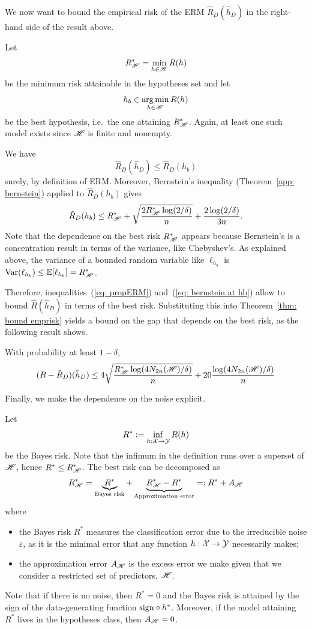 \documentclass[reqno]{amsart}
\begin{document}
We now want to bound the empirical risk of the ERM $\hat R_D(\hat h_D)$ in the right-hand side of the result above. 

Let
\[
R^*_{\mathscr{H}} = \min_{h\in\mathscr{H}} R(h)
\]
be the minimum risk attainable in the hypotheses set
and let \[
h_b \in \operatorname*{arg\,min}_{h\in\mathscr{H}} R(h)
\]
be the best hypothesis, i.e.\ the one attaining $R^*_{\mathscr{H}}$. Again, at least one such model exists since $\mathscr{H}$ is finite and nonempty. 

We have
\begin{equation}\label{eq: propERM}
\hat R_D(\hat h_D) \le \hat R_D (h_b)
\end{equation}
surely, by definition of ERM. Moreover, Bernstein's inequality (Theorem~\ref{app: bernstein}) applied to $\hat R_D(h_b)$ gives
\begin{equation}\label{eq: bernstein at hb}
\hat R_D(h_b) \le R^*_{\mathscr{H}} + \sqrt{\frac{2R^*_{\mathscr{H}} \log (2/\delta)}{n}} + \frac{2\log(2/\delta)}{3n}.
\end{equation}
Note that the dependence on the best risk $R^*_{\mathscr{H}}$ appears because Bernstein's is a concentration result in terms of the variance, like Chebyshev's. As explained above, the variance of a bounded random variable like $\ell_{h_b}$ is $\operatorname{Var}(\ell_{h_b}) \le \mathbb{E}[\ell_{h_b}] = R^*_{\mathscr{H}}$.

Therefore, inequalities~(\ref{eq: propERM}) and~(\ref{eq: bernstein at hb}) allow to bound $\hat R(\hat h_D)$ in terms of the best risk. Substituting this into Theorem~\ref{thm: bound emprisk} yields a bound on the gap that depends on the best risk, as the following result shows. 

\begin{corollary}\label{coroll: bound bestrisk}
    With probability at least $1-\delta$,
    \[
    (R - \hat R_D)(\hat h_D) \le 4\sqrt{\frac{R^*_{\mathscr{H}}\log(4N_{2n}(\mathscr{H})/\delta)}{n}} + 20\frac{\log(4N_{2n}(\mathscr{H})/\delta)}{n}
    \]
\end{corollary}

Finally, we make the dependence on the noise explicit. 

Let
\[
R^* := \inf_{h:\mathcal{X}\to\mathcal{Y}} R(h)
\] 
be the Bayes risk. Note that the infimum in the definition runs over a superset of $\mathscr{H}$, hence $R^* \le R^*_{\mathscr{H}}$. The best risk can be decomposed as 
\[
R^*_{\mathscr{H}} = \underbrace{R^*}_{\text{Bayes risk}} + \underbrace{R^*_{\mathscr{H}} - R^*}_{\text{Approximation error}} =: R^* + A_{\mathscr{H}}
\]
where
\begin{itemize}
\item the Bayes risk $R^*$ measures the classification error due to the irreducible noise $\varepsilon$, as it is the minimal error that any function $h:\mathcal{X}\to\mathcal{Y}$ necessarily makes;
\item the approximation error $A_{\mathscr{H}}$ is the excess error we make given that we consider a restricted set of predictors, $\mathscr{H}$.
\end{itemize}
Note that if there is no noise, then $R^* = 0$ and the Bayes risk is attained by the sign of the data-generating function $\mathrm{sign} \circ h^*$. Moreover, if the model attaining $R^*$ lives in the hypotheses class, then $A_{\mathscr{H}} = 0$.  
\end{document}
